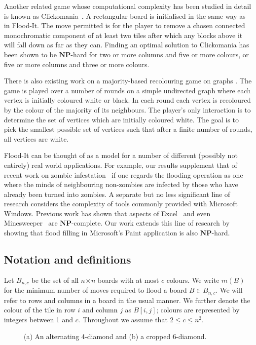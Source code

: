 \documentclass[a4paper,11pt]{llncs}
\newcommand{\pgfgraphic}[1]{}
\newcounter{l}
\renewcommand{\leq}{\leqslant}
\newcommand{\NPtime}{\ensuremath{\mathbf{NP}}}
\newcommand{\recdim}[2]{$#1$$\mspace{1mu}$$\times$$\mspace{1mu}$$#2$}
\begin{document}
Another related game whose computational complexity has been studied in detail is known as Clickomania~\cite{BDDFJM2002:Click}.  A rectangular board is initialised in the same way as in Flood-It. The move permitted is for the player to remove a chosen connected monochromatic component of at least two tiles after which any blocks above it will fall down as far as they can. Finding an optimal solution to Clickomania has been shown to be \NPtime-hard for two or more columns and five or more colours, or five or more columns and three or more colours.

There is also existing work on a majority-based recolouring game on graphs \cite{Berger:2001,Flocchini:2003,Peleg:1998}. The game is played over a number of rounds on a simple undirected graph where each vertex is initially coloured white or black. In each round each vertex is recoloured by the colour of the majority of its neighbours. The player's only interaction is to determine the set of vertices which are initially coloured white. The goal is to pick the smallest possible set of vertices such that after a finite number of rounds, all vertices are white.


Flood-It can be thought of as a model for a number of different (possibly not entirely) real world applications.  For example, our results supplement that of recent work on zombie infestation~\cite{MHIS2009:Zombies} if one regards the flooding operation as one where the minds of neighbouring non-zombies are infected by those who have already been turned into zombies.  A separate but no less significant line of research considers the complexity of tools commonly provided with Microsoft Windows. Previous work has shown that aspects of Excel~\cite{IMO2009:Draw} and even Minesweeper~\cite{Kaye2000:Minesweeper} are \NPtime-complete. Our work extends this line of research by showing that flood filling in Microsoft's Paint application is also \NPtime-hard.

\subsection{Notation and definitions}

Let $B_{n,c}$ be the set of all \recdim{n}{n} boards with at most $c$ colours. We write $m(B)$ for the minimum number of moves required to flood a board $B \in B_{n,c}$. We will refer to rows and columns in a board in the usual manner. We further denote the colour of the tile in row $i$ and column $j$ as $B[i,j]$; colours are represented by integers between 1 and $c$. Throughout we assume that $2 \leq c \leq n^2$.
\begin{figure}[t] \centering

        \centering
        \pgfgraphic{graphic-diamonds}
        \caption{(a) An alternating 4-diamond and (b) a cropped 6-diamond.\label{fig:kdiamonds}}
\end{figure}
\end{document}
